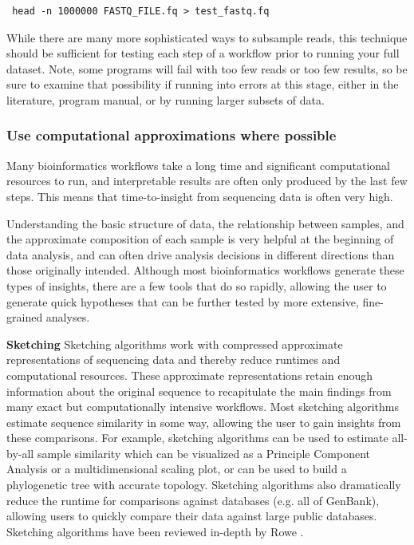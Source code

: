 \documentclass[10pt,letterpaper]{article}
\begin{document}
 \begin{lstlisting}
 head -n 1000000 FASTQ_FILE.fq > test_fastq.fq 
\end{lstlisting}

While there are many more sophisticated ways to subsample reads, this technique should be sufficient for testing each step of a workflow prior to running your full dataset. 
Note, some programs will fail with too few reads or too few results, so be sure to examine that possibility if running into errors at this stage, either in the literature, program manual, or by running larger subsets of data.


\subsubsection*{Use computational approximations where possible}
 
 Many bioinformatics workflows take a long time and significant computational resources to run, and interpretable results are often only produced by the last few steps. 
This means that time-to-insight from sequencing data is often very high. 
 

Understanding the basic structure of data, the relationship between samples, and the approximate composition of each sample is very helpful at the beginning of data analysis, and can often drive analysis decisions in different directions than those originally intended. 
Although most bioinformatics workflows generate these types of insights, there are a few tools that do so rapidly, allowing the user to generate quick hypotheses that can be further tested by more extensive, fine-grained analyses. 

\textbf{Sketching} Sketching algorithms work with compressed approximate representations of sequencing data and thereby reduce runtimes and computational resources. 
These approximate representations retain enough information about the original sequence to recapitulate the main findings from many exact but computationally intensive workflows. 
Most sketching algorithms estimate sequence similarity in some way, allowing the user to gain insights from these comparisons.
For example, sketching algorithms can be used to estimate all-by-all sample similarity which can be visualized as a Principle Component Analysis or a multidimensional scaling plot, or can be used to build a phylogenetic tree with accurate topology. 
Sketching algorithms also dramatically reduce the runtime for comparisons against databases (e.g. all of GenBank), allowing users to quickly compare their data against large public databases. 
Sketching algorithms have been reviewed in-depth by Rowe \cite{rowe2019streaming}.
\end{document}
